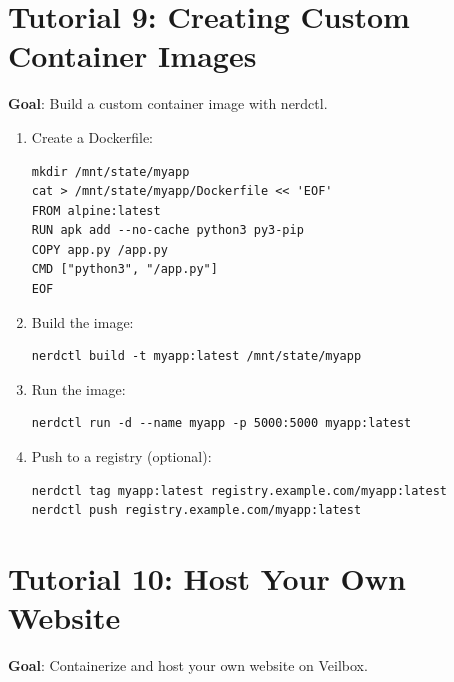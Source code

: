 \section{Tutorial 9: Creating Custom Container Images}

\textbf{Goal}: Build a custom container image with nerdctl.

\begin{enumerate}[nosep]
  \item Create a Dockerfile:
\begin{lstlisting}
mkdir /mnt/state/myapp
cat > /mnt/state/myapp/Dockerfile << 'EOF'
FROM alpine:latest
RUN apk add --no-cache python3 py3-pip
COPY app.py /app.py
CMD ["python3", "/app.py"]
EOF
\end{lstlisting}
  \item Build the image:
\begin{lstlisting}
nerdctl build -t myapp:latest /mnt/state/myapp
\end{lstlisting}
  \item Run the image:
\begin{lstlisting}
nerdctl run -d --name myapp -p 5000:5000 myapp:latest
\end{lstlisting}
   \item Push to a registry (optional):
\begin{lstlisting}
nerdctl tag myapp:latest registry.example.com/myapp:latest
nerdctl push registry.example.com/myapp:latest
\end{lstlisting}
\end{enumerate}

\section{Tutorial 10: Host Your Own Website}

\textbf{Goal}: Containerize and host your own website on Veilbox.

